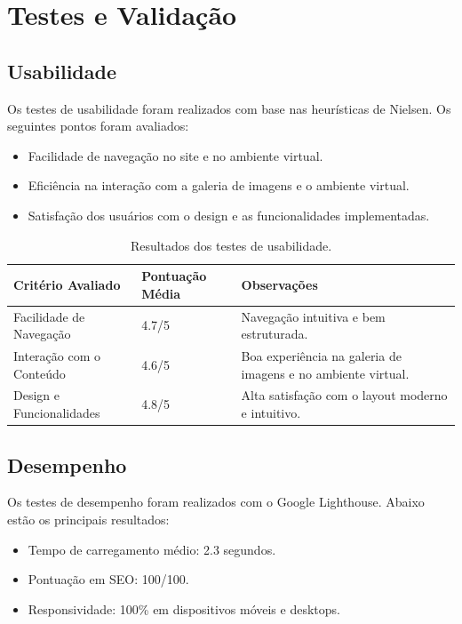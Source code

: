 \section{Testes e Validação}

\subsection{Usabilidade}
Os testes de usabilidade foram realizados com base nas heurísticas de Nielsen. Os seguintes pontos foram avaliados:
\begin{itemize}
    \item Facilidade de navegação no site e no ambiente virtual.
    \item Eficiência na interação com a galeria de imagens e o ambiente virtual.
    \item Satisfação dos usuários com o design e as funcionalidades implementadas.
\end{itemize}


\begin{table}[H]
\centering
\caption{Resultados dos testes de usabilidade.}
\label{tab:usabilidade}
\begin{tabularx}{\textwidth}{|l|X|X|} %
\hline
\textbf{Critério Avaliado} & \textbf{Pontuação Média} & \textbf{Observações} \\ \hline
Facilidade de Navegação    & 4.7/5                   & Navegação intuitiva e bem estruturada. \\ \hline
Interação com o Conteúdo    & 4.6/5                   & Boa experiência na galeria de imagens e no ambiente virtual. \\ \hline
Design e Funcionalidades    & 4.8/5                   & Alta satisfação com o layout moderno e intuitivo. \\ \hline
\end{tabularx}
\end{table}

\subsection{Desempenho}
Os testes de desempenho foram realizados com o Google Lighthouse. Abaixo estão os principais resultados:
\begin{itemize}
    \item Tempo de carregamento médio: 2.3 segundos.
    \item Pontuação em SEO: 100/100.
    \item Responsividade: 100\% em dispositivos móveis e desktops.
\end{itemize}

